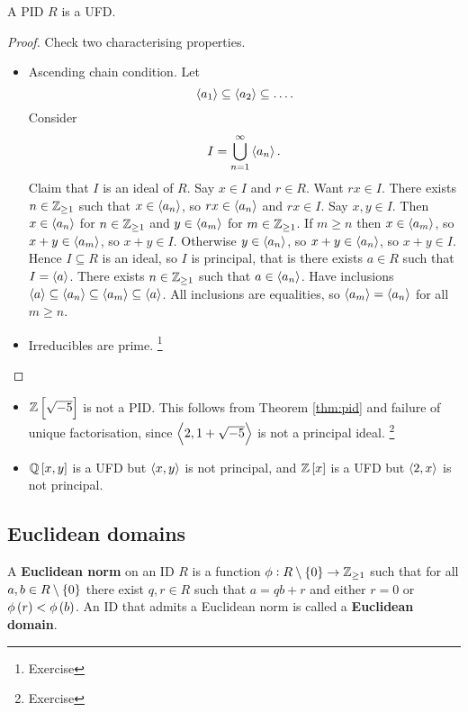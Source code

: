 \begin{theorem}
\label{thm:pid}
A PID $ R $ is a UFD.
\end{theorem}

\begin{proof}
Check two characterising properties.
\begin{itemize}
\item Ascending chain condition. Let
$$ \left\langle a_1 \right\rangle \subseteq \left\langle a_2 \right\rangle \subseteq \dots. $$
Consider
$$ I = \bigcup_{n = 1}^\infty \left\langle a_n \right\rangle. $$
Claim that $ I $ is an ideal of $ R $. Say $ x \in I $ and $ r \in R $. Want $ rx \in I $. There exists $ n \in \mathbb{Z}_{\ge 1} $ such that $ x \in \left\langle a_n \right\rangle $, so $ rx \in \left\langle a_n \right\rangle $ and $ rx \in I $. Say $ x, y \in I $. Then $ x \in \left\langle a_n \right\rangle $ for $ n \in \mathbb{Z}_{\ge 1} $ and $ y \in \left\langle a_m \right\rangle $ for $ m \in \mathbb{Z}_{\ge 1} $. If $ m \ge n $ then $ x \in \left\langle a_m \right\rangle $, so $ x + y \in \left\langle a_m \right\rangle $, so $ x + y \in I $. Otherwise $ y \in \left\langle a_n \right\rangle $, so $ x + y \in \left\langle a_n \right\rangle $, so $ x + y \in I $. Hence $ I \subseteq R $ is an ideal, so $ I $ is principal, that is there exists $ a \in R $ such that $ I = \left\langle a \right\rangle $. There exists $ n \in \mathbb{Z}_{\ge 1} $ such that $ a \in \left\langle a_n \right\rangle $. Have inclusions $ \left\langle a \right\rangle \subseteq \left\langle a_n \right\rangle \subseteq \left\langle a_m \right\rangle \subseteq \left\langle a \right\rangle $. All inclusions are equalities, so $ \left\langle a_m \right\rangle = \left\langle a_n \right\rangle $ for all $ m \ge n $.
\item Irreducibles are prime. \footnote{Exercise}
\end{itemize}
\end{proof}

\pagebreak

\begin{remark*}
\hfill
\begin{itemize}
\item $ \ZZ\sbr{\sqrt{-5}} $ is not a PID. This follows from Theorem \ref{thm:pid} and failure of unique factorisation, since $ \left\langle 2, 1 + \sqrt{-5} \right\rangle $ is not a principal ideal. \footnote{Exercise}
\item $ \QQ\sbr{x, y} $ is a UFD but $ \left\langle x, y \right\rangle $ is not principal, and $ \ZZ\sbr{x} $ is a UFD but $ \left\langle 2, x \right\rangle $ is not principal.
\end{itemize}
\end{remark*}

\subsection{Euclidean domains}

\begin{definition}
A \textbf{Euclidean norm} on an ID $ R $ is a function $ \phi : R \setminus \cbr{0} \to \ZZ_{\ge 1} $ such that for all $ a, b \in R \setminus \cbr{0} $ there exist $ q, r \in R $ such that $ a = qb + r $ and either $ r = 0 $ or $ \phi\br{r} < \phi\br{b} $. An ID that admits a Euclidean norm is called a \textbf{Euclidean domain}.
\end{definition}


